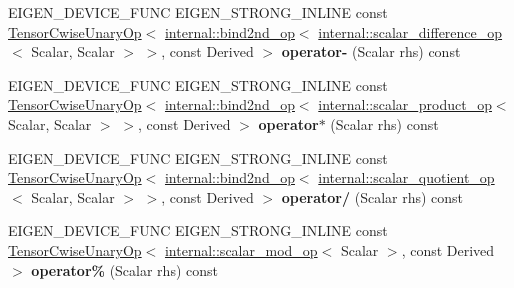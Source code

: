 \begin{DoxyCompactItemize}
E\+I\+G\+E\+N\+\_\+\+D\+E\+V\+I\+C\+E\+\_\+\+F\+U\+NC E\+I\+G\+E\+N\+\_\+\+S\+T\+R\+O\+N\+G\+\_\+\+I\+N\+L\+I\+NE const \hyperlink{class_eigen_1_1_tensor_cwise_unary_op}{Tensor\+Cwise\+Unary\+Op}$<$ \hyperlink{struct_eigen_1_1internal_1_1bind2nd__op}{internal\+::bind2nd\+\_\+op}$<$ \hyperlink{struct_eigen_1_1internal_1_1scalar__difference__op}{internal\+::scalar\+\_\+difference\+\_\+op}$<$ Scalar, Scalar $>$ $>$, const Derived $>$ {\bfseries operator-\/} (Scalar rhs) const
\item 
\mbox{\label{class_eigen_1_1_tensor_base_3_01_derived_00_01_read_only_accessors_01_4_a7906052a9579bfc682ce9840ef6d2e80}} 
E\+I\+G\+E\+N\+\_\+\+D\+E\+V\+I\+C\+E\+\_\+\+F\+U\+NC E\+I\+G\+E\+N\+\_\+\+S\+T\+R\+O\+N\+G\+\_\+\+I\+N\+L\+I\+NE const \hyperlink{class_eigen_1_1_tensor_cwise_unary_op}{Tensor\+Cwise\+Unary\+Op}$<$ \hyperlink{struct_eigen_1_1internal_1_1bind2nd__op}{internal\+::bind2nd\+\_\+op}$<$ \hyperlink{struct_eigen_1_1internal_1_1scalar__product__op}{internal\+::scalar\+\_\+product\+\_\+op}$<$ Scalar, Scalar $>$ $>$, const Derived $>$ {\bfseries operator$\ast$} (Scalar rhs) const
\item 
\mbox{\label{class_eigen_1_1_tensor_base_3_01_derived_00_01_read_only_accessors_01_4_ad03d03be1b8555a9026fbfb746f1a1fd}} 
E\+I\+G\+E\+N\+\_\+\+D\+E\+V\+I\+C\+E\+\_\+\+F\+U\+NC E\+I\+G\+E\+N\+\_\+\+S\+T\+R\+O\+N\+G\+\_\+\+I\+N\+L\+I\+NE const \hyperlink{class_eigen_1_1_tensor_cwise_unary_op}{Tensor\+Cwise\+Unary\+Op}$<$ \hyperlink{struct_eigen_1_1internal_1_1bind2nd__op}{internal\+::bind2nd\+\_\+op}$<$ \hyperlink{struct_eigen_1_1internal_1_1scalar__quotient__op}{internal\+::scalar\+\_\+quotient\+\_\+op}$<$ Scalar, Scalar $>$ $>$, const Derived $>$ {\bfseries operator/} (Scalar rhs) const
\item 
\mbox{\label{class_eigen_1_1_tensor_base_3_01_derived_00_01_read_only_accessors_01_4_af116c9bf46993767d5e3a205b73fd9ff}} 
E\+I\+G\+E\+N\+\_\+\+D\+E\+V\+I\+C\+E\+\_\+\+F\+U\+NC E\+I\+G\+E\+N\+\_\+\+S\+T\+R\+O\+N\+G\+\_\+\+I\+N\+L\+I\+NE const \hyperlink{class_eigen_1_1_tensor_cwise_unary_op}{Tensor\+Cwise\+Unary\+Op}$<$ \hyperlink{struct_eigen_1_1internal_1_1scalar__mod__op}{internal\+::scalar\+\_\+mod\+\_\+op}$<$ Scalar $>$, const Derived $>$ {\bfseries operator\%} (Scalar rhs) const

\end{DoxyCompactItemize}
